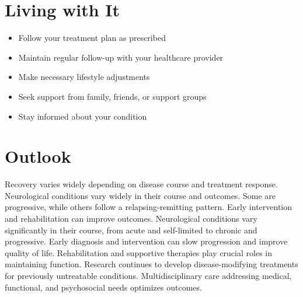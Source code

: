 \section{Living with It}
\begin{itemize}[noitemsep]
  \item Follow your treatment plan as prescribed
  \item Maintain regular follow-up with your healthcare provider
  \item Make necessary lifestyle adjustments
  \item Seek support from family, friends, or support groups
  \item Stay informed about your condition
\end{itemize}
\section{Outlook}
Recovery varies widely depending on disease course and treatment response. Neurological conditions vary widely in their course and outcomes. Some are progressive, while others follow a relapsing-remitting pattern. Early intervention and rehabilitation can improve outcomes. Neurological conditions vary significantly in their course, from acute and self-limited to chronic and progressive. Early diagnosis and intervention can slow progression and improve quality of life. Rehabilitation and supportive therapies play crucial roles in maintaining function. Research continues to develop disease-modifying treatments for previously untreatable conditions. Multidisciplinary care addressing medical, functional, and psychosocial needs optimizes outcomes.

